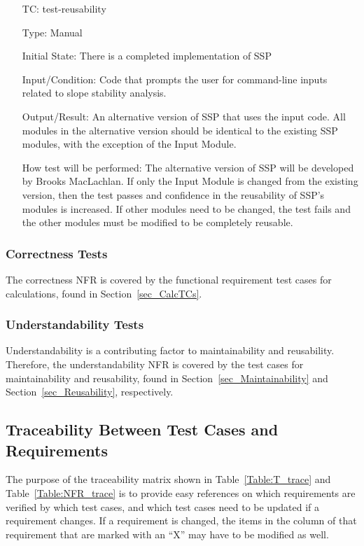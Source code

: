 \documentclass[12pt, titlepage]{article}
\newcounter{testnum} %
\newcommand{\progname}{SSP}
\begin{document}
\begin{enumerate}[label=TC\arabic*:,ref={\arabic*}]
	
\item [TC\refstepcounter{testnum}\thetestnum: \label{TC_Reusability}] 
test-reusability

Type: Manual

Initial State: There is a completed implementation of \progname{}
	
Input/Condition: Code that prompts the user for command-line inputs related to 
slope stability analysis.

Output/Result: An alternative version of \progname{} that uses the input code. 
All modules in the alternative version should be identical to the existing 
\progname{} modules, with the exception of the Input Module.

How test will be performed: The alternative version of \progname{} will be 
developed by Brooks MacLachlan. If only the Input Module is changed from the 
existing version, then the test passes and confidence in the reusability of 
\progname{}'s modules is increased. If other modules need to be changed, the 
test fails and the other modules must be modified to be completely reusable.
	
\end{enumerate}

\subsubsection{Correctness Tests}
The correctness NFR is covered by the functional requirement test cases for 
calculations, found in 
Section~\ref{sec_CalcTCs}.

\subsubsection{Understandability Tests}
Understandability is a contributing factor to maintainability and reusability. 
Therefore, the understandability NFR is covered by the test cases for 
maintainability and reusability, found in Section~\ref{sec_Maintainability} and 
Section~\ref{sec_Reusability}, respectively.

\subsection{Traceability Between Test Cases and Requirements}

\noindent The purpose of the traceability matrix shown in 
Table~\ref{Table:T_trace} and Table~\ref{Table:NFR_trace} is to provide easy 
references on which requirements are verified by which test cases, and which 
test cases need to be updated if a requirement changes.  If a requirement is 
changed, the items in the column of that requirement that are marked
with an ``X'' may have to be modified as well. 
\end{document}
